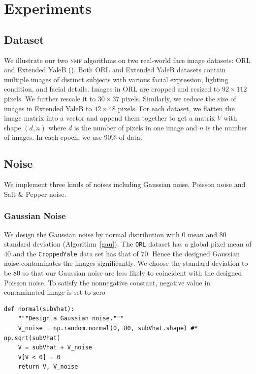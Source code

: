 \section{Experiments}\label{chapter4}

\subsection{Dataset}
We illustrate our two \textsc{nmf} algorithms on two real-world face image datasets: ORL and Extended YaleB (\citet{belhumeur1997eigenfaces}). 
Both ORL and Extended YaleB datasets contain multiple images of distinct subjects with various facial expression, lighting condition, and facial details. 
Images in ORL are cropped and resized to $92 \times 112$ pixels. We further rescale it to $30 \times 37$ pixels. Similarly, we reduce the size of images in Extended YaleB to $42 \times 48$ pixels.
For each dataset, we flatten the image matrix into a vector and append them together to get a matrix $V$ with shape $(d, n)$ where $d$ is the number of pixels in one image and $n$ is the number of images. In each epoch, we use 90\% of data. 

\subsection{Noise}
We implement three kinds of noises including Gaussian noise, Poisson noise and Salt \& Pepper noise.
\subsubsection{Gaussian Noise}
We design the Gaussian noise by normal distribution with $0$ mean and $80$ standard deviation (Algorithm~\ref{gau}). The \texttt{ORL} dataset has a global pixel mean of $40$ and the \texttt{CroppedYale} data set has that of $70$. Hence the designed Gaussian noise contaminates the images significantly. We choose the standard deviation to be $80$ so that our Gaussian noise are less likely to coincident with the designed Poisson noise. To satisfy the nonnegative constant, negative value in contaminated image is set to zero
\begin{lstlisting}[caption= Gaussian Noise Design, label=gau]
def normal(subVhat):
    """Design a Gaussian noise."""
    V_noise = np.random.normal(0, 80, subVhat.shape) #* np.sqrt(subVhat)
    V = subVhat + V_noise
    V[V < 0] = 0
    return V, V_noise
\end{lstlisting}


